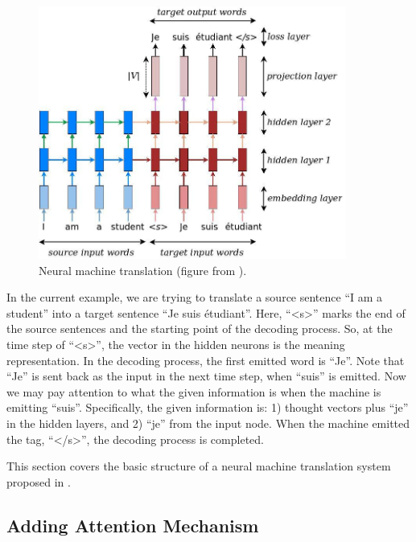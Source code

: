\documentclass[final]{ua-thesis}
\numberwithin{equation}{section}
\begin{document}
\begin{figure}[h]
\caption{Neural machine translation (figure from \citet{luong17GitHub}).}
\centering
\includegraphics[width=0.9\textwidth]{seq2seq.jpg}
\end{figure} 

In the current example, we are trying to translate a source sentence ``I am a student'' into a target sentence ``Je suis \'{e}tudiant''. Here, ``<s>'' marks the end of the source sentences and the starting point of the decoding process. 
So, at the time step of  ``<s>'', the vector in the hidden neurons is the meaning representation. In the decoding process, the first emitted word is ``Je''. Note that ``Je'' is sent back as the input in the next time step, when ``suis'' is emitted. Now we may pay attention to what the given information is when the machine is emitting ``suis''. Specifically, the given information is: 1) thought vectors plus ``je'' in the hidden layers, and 2) ``je'' from the input node. When the machine emitted the tag, ``</s>'', the decoding process is completed. 

This section covers the basic structure of a neural machine translation system proposed in \citet{cho2014properties, cho2014learning}.  


\subsection{Adding Attention Mechanism}
\end{document}
